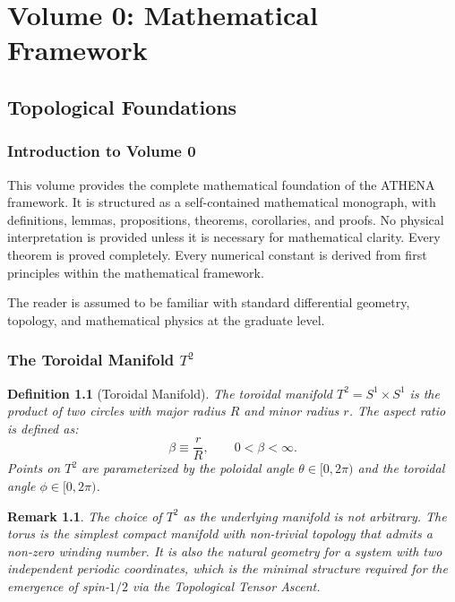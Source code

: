 \documentclass[12pt,oneside]{book}
\newtheorem{definition}{Definition}[chapter]
\newtheorem{remark}{Remark}[chapter]
\begin{document}
\tableofcontents

\mainmatter

\part{Volume 0: Mathematical Framework}

\chapter{Topological Foundations}

\section{Introduction to Volume 0}

This volume provides the complete mathematical foundation of the ATHENA framework. It is structured as a self-contained mathematical monograph, with definitions, lemmas, propositions, theorems, corollaries, and proofs. No physical interpretation is provided unless it is necessary for mathematical clarity. Every theorem is proved completely. Every numerical constant is derived from first principles within the mathematical framework.

The reader is assumed to be familiar with standard differential geometry, topology, and mathematical physics at the graduate level.

\section{The Toroidal Manifold $T^2$}

\begin{definition}[Toroidal Manifold]
The toroidal manifold $T^2 = S^1 \times S^1$ is the product of two circles with major radius $R$ and minor radius $r$. The aspect ratio is defined as:
\[
\beta \equiv \frac{r}{R}, \qquad 0 < \beta < \infty.
\]
Points on $T^2$ are parameterized by the poloidal angle $\theta \in [0,2\pi)$ and the toroidal angle $\phi \in [0,2\pi)$.
\end{definition}

\begin{remark}
The choice of $T^2$ as the underlying manifold is not arbitrary. The torus is the simplest compact manifold with non-trivial topology that admits a non-zero winding number. It is also the natural geometry for a system with two independent periodic coordinates, which is the minimal structure required for the emergence of spin-$1/2$ via the Topological Tensor Ascent.
\end{remark}
\end{document}
